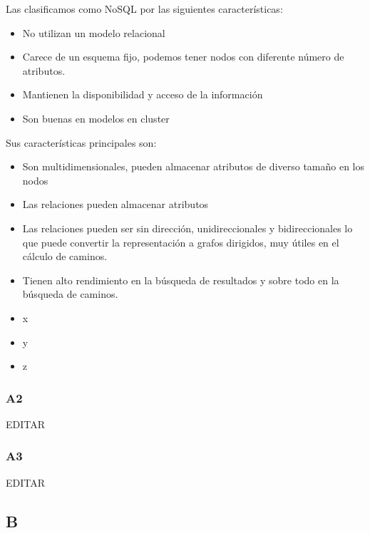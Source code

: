 \documentclass[preprint,12pt]{elsarticle}
\begin{document}
Las clasificamos como NoSQL por las siguientes características:
\begin{itemize}
     \item No utilizan un modelo relacional 
     \item Carece de un esquema fijo, podemos tener nodos con diferente número de atributos.  
     \item Mantienen la disponibilidad y acceso de la información
     \item Son buenas en modelos en cluster
\end{itemize}

Sus características principales son:
\begin{itemize}
 \item Son multidimensionales, pueden almacenar atributos de diverso tamaño en los nodos
 \item Las relaciones pueden almacenar atributos
 \item Las relaciones pueden ser sin dirección, unidireccionales y bidireccionales lo que puede convertir la representación a grafos dirigidos, muy útiles en el cálculo de caminos.
 \item Tienen alto rendimiento en la búsqueda de resultados y sobre todo en la búsqueda de caminos.
\end{itemize}
\cite{Gartner} 


\begin{itemize}
	\item x
	\item y
	\item z
\end{itemize}

\subsubsection{\textbf{A2}}

EDITAR\\

\subsubsection{\textbf{A3}}

EDITAR\\



\subsection{\textbf{B}}
\end{document}
